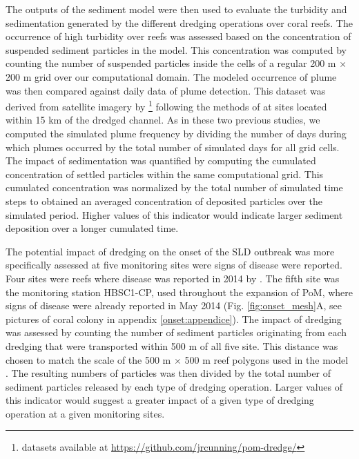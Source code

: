 The outputs of the sediment model were then used to evaluate the turbidity and sedimentation generated by the different dredging operations over coral reefs. The occurrence of high turbidity over reefs was assessed based on the concentration of suspended sediment particles in the model. This concentration was computed by counting the number of suspended particles inside the cells of a regular 200 m $\times$ 200 m grid over our computational domain. The modeled occurrence of plume was then compared against daily data of plume detection. This dataset was derived from satellite imagery by \cite{cunning2019extensive}\footnote{datasets available at \url{https://github.com/jrcunning/pom-dredge/}} following the methods of \cite{barnes2015sediment} at sites located within 15 km of the dredged channel. As in these two previous studies, we computed  the simulated plume frequency by dividing the number of days during which plumes occurred by the total number of simulated days for all grid cells. The impact of sedimentation was quantified by computing the cumulated concentration of settled particles within the same computational grid. This cumulated concentration was normalized by the total number of simulated time steps to obtained an averaged concentration of deposited particles over the simulated period. Higher values of this indicator would indicate larger sediment deposition over a longer cumulated time.

The potential impact of dredging on the onset of the SLD outbreak was more specifically assessed at five monitoring sites were signs of disease were reported. Four sites were reefs where disease was reported in 2014 by \cite{precht2016unprecedented}. The fifth site was the monitoring station HBSC1-CP, used throughout the expansion of PoM, where signs of disease were already reported in May 2014 (Fig. \ref{fig:onset_mesh}A, see pictures of coral colony in appendix \ref{onset:appendice}). The impact of dredging was assessed by counting the number of sediment particles originating from each dredging that were transported within 500 m of all five site. This distance was chosen to match the scale of the 500 m $\times$ 500 m reef polygons used in the model \citep{dobbelaere2020coupled}. The resulting numbers of particles was then divided by the total number of sediment particles released by each type of dredging operation. Larger values of this indicator would suggest a greater impact of a given type of dredging operation at a given monitoring sites.  

